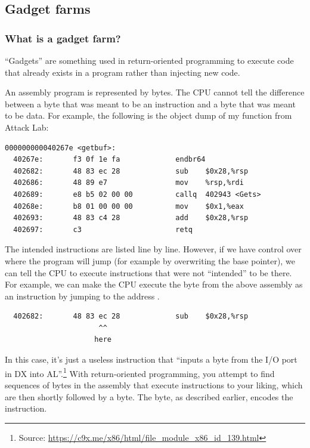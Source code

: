\subsection{Gadget farms}

\subsubsection{What is a gadget farm?}

``Gadgets'' are something used in return-oriented programming to execute code that already exists in a program rather than injecting new code.

An assembly program is represented by bytes. The CPU cannot tell the difference between a byte that was meant to be an instruction and a byte that was meant to be data. For example, the following is the object dump of my  function from Attack Lab:

\begin{verbatim}
000000000040267e <getbuf>:
  40267e:       f3 0f 1e fa             endbr64
  402682:       48 83 ec 28             sub    $0x28,%rsp
  402686:       48 89 e7                mov    %rsp,%rdi
  402689:       e8 b5 02 00 00          callq  402943 <Gets>
  40268e:       b8 01 00 00 00          mov    $0x1,%eax
  402693:       48 83 c4 28             add    $0x28,%rsp
  402697:       c3                      retq
\end{verbatim}

The intended instructions are listed line by line. However, if we have control over where the program will jump (for example by overwriting the base pointer), we can tell the CPU to execute instructions that were not ``intended'' to be there. For example, we can make the CPU execute the  byte from the above assembly as an instruction by jumping to the address .

\begin{verbatim}
  402682:       48 83 ec 28             sub    $0x28,%rsp
                      ^^
                     here
\end{verbatim}

In this case, it's just a useless instruction that ``inputs a byte from the I/O port in DX into AL''.\footnote{Source: \url{https://c9x.me/x86/html/file_module_x86_id_139.html}} With return-oriented programming, you attempt to find sequences of bytes in the assembly that execute instructions to your liking, which are then shortly followed by a  byte. The  byte, as described earlier, encodes the  instruction. 

